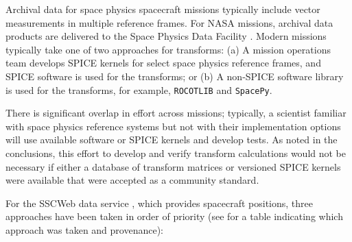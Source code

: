 \documentclass[draft]{agujournal2019}
\begin{document}
Archival data for space physics spacecraft missions typically include vector measurements in multiple reference frames. For NASA missions, archival data products are delivered to the Space Physics Data Facility \cite{SPDF}. Modern missions typically take one of two approaches for transforms: (a) A mission operations team develops SPICE kernels for select space physics reference frames, and SPICE software is used for the transforms; or (b) A non-SPICE software library is used for the transforms, for example, \texttt{ROCOTLIB} and \texttt{SpacePy}. 

There is significant overlap in effort across missions; typically, a scientist familiar with space physics reference systems but not with their implementation options will use available software or SPICE kernels and develop tests. As noted in the conclusions, this effort to develop and verify transform calculations would not be necessary if either a database of transform matrices or versioned SPICE kernels were available that were accepted as a community standard. 

For the SSCWeb data service \cite{SSCWeb}, which provides spacecraft positions, three approaches have been taken in order of priority (see  for a table indicating which approach was taken and provenance):
\end{document}
